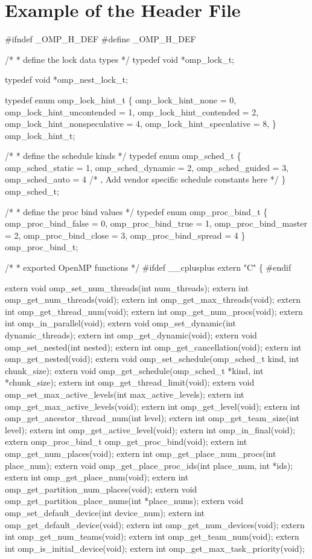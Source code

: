 \section{Example of the  Header File}
\label{sec:Example of the omp.h Header File}
{\small \begin{codepar}
\#ifndef \_OMP\_H\_DEF
\#define \_OMP\_H\_DEF

/*
 * define the lock data types
 */
typedef void *omp\_lock\_t;

typedef void *omp\_nest\_lock\_t;

typedef enum omp\_lock\_hint\_t 
\{
 omp\_lock\_hint\_none = 0,
 omp\_lock\_hint\_uncontended = 1,
 omp\_lock\_hint\_contended = 2,
 omp\_lock\_hint\_nonspeculative = 4,
 omp\_lock\_hint\_speculative = 8,
\} omp\_lock\_hint\_t;

/*
 * define the schedule kinds
 */
typedef enum omp\_sched\_t
\{
 omp\_sched\_static = 1,
 omp\_sched\_dynamic = 2,
 omp\_sched\_guided = 3,
 omp\_sched\_auto = 4
/* , Add vendor specific schedule constants here */
\} omp\_sched\_t;

/*
* define the proc bind values 
*/ 
typedef enum omp\_proc\_bind\_t
\{
 omp\_proc\_bind\_false = 0,
 omp\_proc\_bind\_true = 1,
 omp\_proc\_bind\_master = 2,
 omp\_proc\_bind\_close = 3,
 omp\_proc\_bind\_spread = 4
\} omp\_proc\_bind\_t; 

/*
 * exported OpenMP functions
 */
\#ifdef _\_cplusplus
extern "C"
\{
\#endif

extern void omp\_set\_num\_threads(int num\_threads);
extern int omp\_get\_num\_threads(void);
extern int omp\_get\_max\_threads(void);
extern int omp\_get\_thread\_num(void);
extern int omp\_get\_num\_procs(void);
extern int omp\_in\_parallel(void);
extern void omp\_set\_dynamic(int dynamic\_threads);
extern int omp\_get\_dynamic(void);
extern void omp\_set\_nested(int nested);
extern int omp\_get\_cancellation(void);
extern int omp\_get\_nested(void);
extern void omp\_set\_schedule(omp\_sched\_t kind, int chunk\_size);
extern void omp\_get\_schedule(omp\_sched\_t *kind, int *chunk\_size);
extern int omp\_get\_thread\_limit(void);
extern void omp\_set\_max\_active\_levels(int max\_active\_levels);
extern int omp\_get\_max\_active\_levels(void);
extern int omp\_get\_level(void);
extern int omp\_get\_ancestor\_thread\_num(int level);
extern int omp\_get\_team\_size(int level);
extern int omp\_get\_active\_level(void);
extern int omp\_in\_final(void);
extern omp\_proc\_bind\_t omp\_get\_proc\_bind(void);
extern int omp\_get\_num\_places(void);
extern int omp\_get\_place\_num\_procs(int place\_num);
extern void omp\_get\_place\_proc\_ids(int place\_num, int *ids);
extern int omp\_get\_place\_num(void);
extern int omp\_get\_partition\_num\_places(void);
extern void omp\_get\_partition\_place\_nums(int *place\_nums);
extern void omp\_set\_default\_device(int device\_num);
extern int omp\_get\_default\_device(void);
extern int omp\_get\_num\_devices(void);
extern int omp\_get\_num\_teams(void);
extern int omp\_get\_team\_num(void);
extern int omp\_is\_initial\_device(void);
extern int omp\_get\_max\_task\_priority(void);


\end{codepar}}
